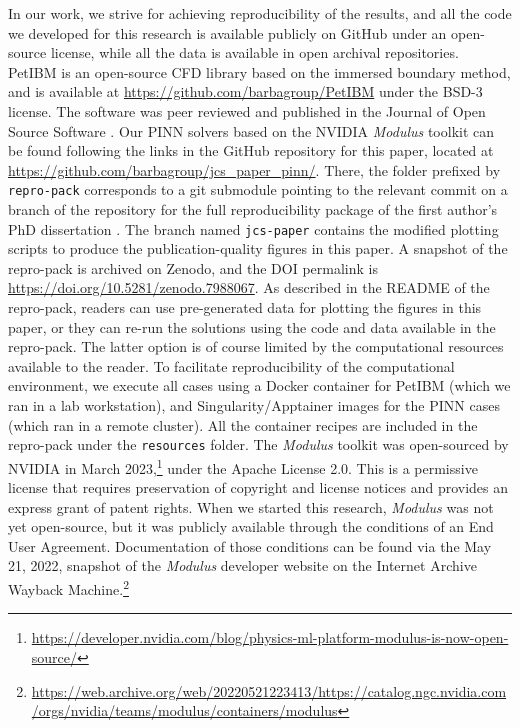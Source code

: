 
In our work, we strive for achieving reproducibility of the results, and all the code we developed for this research is available publicly on GitHub under an open-source license, while all the data is available in open archival repositories.
PetIBM is an open-source CFD library based on the immersed boundary method, and is available at \url{https://github.com/barbagroup/PetIBM} under the BSD-3 license. 
The software was peer reviewed and published in the Journal of Open Source Software \cite{chuang_petibm_2018}. 
Our PINN solvers based on the NVIDIA \emph{Modulus} toolkit can be found following the links in the GitHub repository for this paper, located at \url{https://github.com/barbagroup/jcs_paper_pinn/}. 
There, the folder prefixed by \texttt{repro-pack} corresponds to a git submodule pointing to the relevant commit on a branch of the repository for the full reproducibility package of the first author's PhD dissertation \cite{chuang_thesis_2023}.
The branch named \texttt{jcs-paper} contains the modified plotting scripts to produce the publication-quality figures in this paper.    
A snapshot of the repro-pack is archived on Zenodo, and the DOI permalink is \url{https://doi.org/10.5281/zenodo.7988067}.
As described in the README of the repro-pack, readers can use pre-generated data for plotting the figures in this paper, or they can re-run the solutions using the code and data available in the repro-pack.
The latter option is of course limited by the computational resources available to the reader.
To facilitate reproducibility of the computational environment, we execute all cases using a Docker container for PetIBM (which we ran in a lab workstation), and Singularity/Apptainer images for the PINN cases (which ran in a remote cluster). 
All the container recipes are included in the repro-pack under the \texttt{resources} folder. 
The \emph{Modulus} toolkit was open-sourced by NVIDIA in March 2023,\footnote{\url{https://developer.nvidia.com/blog/physics-ml-platform-modulus-is-now-open-source/}} under the Apache License 2.0.
This is a permissive license that requires preservation of copyright and license notices and provides an express grant of patent rights. 
When we started this research, \emph{Modulus} was not yet open-source, but it was publicly available through the conditions of an End User Agreement. 
Documentation of those conditions can be found via the May 21, 2022, snapshot of the \emph{Modulus} developer website on the Internet Archive Wayback Machine.\footnote{\url{https://web.archive.org/web/20220521223413/https://catalog.ngc.nvidia.com/orgs/nvidia/teams/modulus/containers/modulus}}